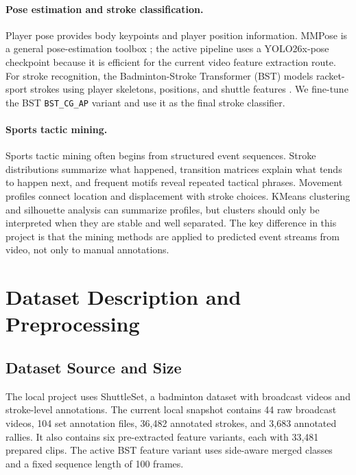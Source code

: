 \documentclass{article}
\begin{document}
\paragraph{Pose estimation and stroke classification.}
Player pose provides body keypoints and player position information. MMPose is
a general pose-estimation toolbox \cite{mmpose}; the active pipeline uses a
YOLO26x-pose checkpoint because it is efficient for the current video feature
extraction route. For stroke recognition, the Badminton-Stroke Transformer
(BST) models racket-sport strokes using player skeletons, positions, and
shuttle features \cite{chang2025bst}. We fine-tune the BST \texttt{BST\_CG\_AP}
variant and use it as the final stroke classifier.

\paragraph{Sports tactic mining.}
Sports tactic mining often begins from structured event sequences. Stroke
distributions summarize what happened, transition matrices explain what tends
to happen next, and frequent motifs reveal repeated tactical phrases.
Movement profiles connect location and displacement with stroke choices.
KMeans clustering \cite{kmeans} and silhouette analysis \cite{silhouette} can
summarize profiles, but clusters should only be interpreted when they are
stable and well separated. The key difference in this project is that the
mining methods are applied to predicted event streams from video, not only to
manual annotations.

\section{Dataset Description and Preprocessing}

\subsection{Dataset Source and Size}

The local project uses ShuttleSet, a badminton dataset with broadcast videos
and stroke-level annotations. The current local snapshot contains 44 raw
broadcast videos, 104 set annotation files, 36,482 annotated strokes, and
3,683 annotated rallies. It also contains six pre-extracted feature variants,
each with 33,481 prepared clips. The active BST feature variant uses
side-aware merged classes and a fixed sequence length of 100 frames.
\end{document}
